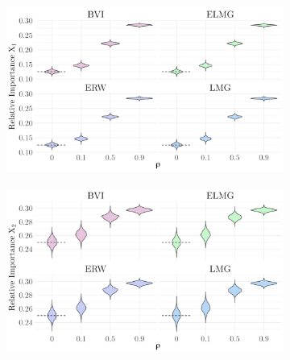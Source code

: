 \begin{figure}[H]
  \centering
  \begin{subfigure}[b]{0.75\linewidth}
    \centering
    \includegraphics[width=\linewidth]{Figures/ViolinPlots/Variance_V1.png}
    \label{fig:relimp_X1_fig}
  \end{subfigure}
  
  \begin{subfigure}[b]{0.75\linewidth}
    \centering
    \includegraphics[width=\linewidth]{Figures/ViolinPlots/Variance_V2.png}
    \label{fig:relimp_X2_fig}
  \end{subfigure}
  

\end{figure}
